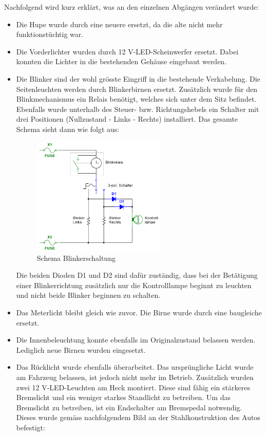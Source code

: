 Nachfolgend wird kurz erklärt, was an den einzelnen Abgängen verändert wurde:
\begin{itemize}
\item Die Hupe wurde durch eine neuere ersetzt, da die alte nicht mehr funktionstüchtig war.
\item Die Vorderlichter wurden durch 12 V-LED-Scheinwerfer ersetzt. Dabei konnten die Lichter in die bestehenden Gehäuse eingebaut werden.
\item Die Blinker sind der wohl grösste Eingriff in die bestehende Verkabelung. Die Seitenleuchten werden durch Blinkerbirnen ersetzt. Zusätzlich wurde für den Blinkmechanismus ein Relais benötigt, welches sich unter dem Sitz befindet. Ebenfalls wurde unterhalb des Steuer- bzw. Richtungshebels ein Schalter mit drei Positionen (Nullzustand - Links - Rechts) installiert. Das gesamte Schema sieht dann wie folgt aus:

\begin{figure}[h]
	\centering
		\includegraphics[width=0.6\textwidth]{images/Blinkerschaltung_Schema}
	\caption{Schema Blinkerschaltung}
	\label{fig:SchemaBlinkerschaltung}
\end{figure}

Die beiden Dioden D1 und D2 sind dafür zuständig, dass bei der Betätigung einer Blinkerrichtung zusätzlich nur die Kontrolllampe beginnt zu leuchten und nicht beide Blinker beginnen zu schalten.
\item Das Meterlicht bleibt gleich wie zuvor. Die Birne wurde durch eine baugleiche ersetzt.
\item Die Innenbeleuchtung konnte ebenfalls im Originalzustand belassen werden. Lediglich neue Birnen wurden eingesetzt.
\newpage
\item Das Rücklicht wurde ebenfalls überarbeitet. Das ursprüngliche Licht wurde am Fahrzeug belassen, ist jedoch nicht mehr im Betrieb. Zusätzlich wurden zwei 12 V-LED-Leuchten am Heck montiert. Diese sind fähig ein stärkeres Bremslicht und ein weniger starkes Standlicht zu betreiben. Um das Bremslicht zu betreiben, ist ein Endschalter am Bremspedal notwendig. Dieses wurde gemäss nachfolgendem Bild an der Stahlkonstruktion des Autos befestigt:


\end{itemize}
